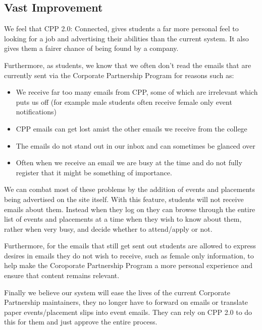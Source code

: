 \subsection{Vast Improvement}
We feel that CPP 2.0: Connected, gives students a far more personal feel to looking for a job and advertising their abilities than the current system. It also gives them a fairer chance of being found by a company.

Furthermore, as students, we know that we often don't read the emails that are currently sent via the Corporate Partnership Program for reasons such as:
\begin{itemize}
  \item We receive far too many emails from CPP, some of which are irrelevant which puts us off (for example male students often receive female only event notifications)
  \item CPP emails can get lost amist the other emails we receive from the college
  \item The emails do not stand out in our inbox and can sometimes be glanced over
  \item Often when we receive an email we are busy at the time and do not fully register that it might be something of importance.
\end{itemize} 

We can combat most of these problems by the addition of events and placements being advertised on the site itself. With this feature, students will not receive emails about them. Instead when they log on they can browse through the entire list of events and placements at a time when they wish to know about them, rather when very busy, and decide whether to attend/apply or not.

Furthermore, for the emails that still get sent out students are  allowed to express desires in emails they do not wish to receive, such as female only information, to help make the Coroporate Partnership Program a more personal experience and ensure that content remains relevant. 

Finally we believe our system will ease the lives of the current Corporate Partnership maintainers, they no longer have to forward on emails or translate paper events/placement slips into event emails. They can rely on CPP 2.0 to do this for them and just approve the entire process.